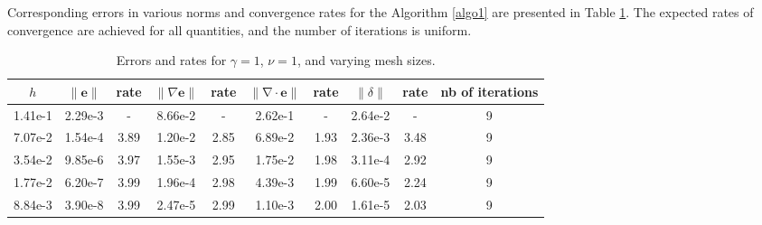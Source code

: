 \documentclass[3p]{elsarticle}
\def\V#1{\mathbf{#1}}
\newcommand{\divergence}{\mathrm{\nabla \cdot}}
\begin{document}
Corresponding errors in various norms and convergence rates for the Algorithm \ref{algo1} are presented in Table \ref{tab:RateTable}. The expected rates of convergence are achieved for all quantities, and the number of iterations is uniform.
\begin{table}[H]
 \begin{center} 
 \caption{Errors and rates for $\gamma=1$, $\nu=1$, and varying mesh sizes.}\label{tab:RateTable} 
\begin{tabular}{|c|c|c|c|c|c|c|c|c|c|}
\hline
$h$ & $\|\V{e}\|$& rate & $\|\nabla \V{e}\|$ & rate & $\|\divergence \V{e}\|$ & rate & $\|\delta\|$ & rate & nb of iterations \\
\hline
\hline 
1.41e-1 & 2.29e-3 & - & 8.66e-2 & - & 2.62e-1 & - & 2.64e-2 & - & 9 \\
\hline
7.07e-2 & 1.54e-4 & 3.89 & 1.20e-2 & 2.85 & 6.89e-2 & 1.93 & 2.36e-3 & 3.48 & 9 \\
\hline
3.54e-2 & 9.85e-6 & 3.97 & 1.55e-3 & 2.95 & 1.75e-2 & 1.98 & 3.11e-4 & 2.92 & 9 \\
\hline
1.77e-2 & 6.20e-7 & 3.99 & 1.96e-4 & 2.98 & 4.39e-3 & 1.99 & 6.60e-5 & 2.24 & 9 \\
\hline
8.84e-3 & 3.90e-8 & 3.99 & 2.47e-5 & 2.99 & 1.10e-3 & 2.00 & 1.61e-5 & 2.03 & 9 \\
\hline
\end{tabular}
\end{center}
\end{table}
%
%
%
\end{document}
